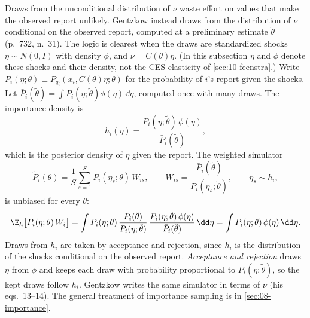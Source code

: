  Draws from the unconditional distribution of $\nu$ waste effort on values that make the
observed report unlikely. Gentzkow instead draws from the distribution of $\nu$ conditional on the observed report,
computed at a preliminary estimate $\tilde\theta$ (p.~732, n.~31). The logic is clearest when the draws are standardized
shocks $\eta \sim N(0, I)$ with density $\phi$, and $\nu = C(\theta)\eta$. (In this subsection $\eta$ and $\phi$
denote these shocks and their density, not the CES elasticity of \cref{sec:10-feenstra}.) Write $P_i(\eta; \theta) \equiv
P_{q_i}(x_i, C(\theta)\eta; \theta)$ for the probability of $i$'s report given the shocks. Let $\bar P_i(\tilde\theta) = \int
P_i(\eta; \tilde\theta)\phi(\eta)\,\dd\eta$, computed once with many draws. The importance density is
\begin{equation*}
  h_i(\eta) = \frac{P_i(\eta; \tilde\theta)\,\phi(\eta)}{\bar P_i(\tilde\theta)} ,
\end{equation*}
which is the posterior density of $\eta$ given the report. The weighted simulator
\begin{equation*}
  \tilde P_i(\theta) = \frac{1}{S}\sum_{s=1}^{S}P_i(\eta_s; \theta)\,W_{is}, \qquad
  W_{is} = \frac{\bar P_i(\tilde\theta)}{P_i(\eta_s; \tilde\theta)}, \qquad \eta_s \sim h_i,
\end{equation*}
is unbiased for every $\theta$:
\begin{equation*}
  \E_h\bigl[P_i(\eta; \theta)\,W_i\bigr]
  = \int P_i(\eta; \theta)\,\frac{\bar P_i(\tilde\theta)}{P_i(\eta; \tilde\theta)}\,
    \frac{P_i(\eta; \tilde\theta)\,\phi(\eta)}{\bar P_i(\tilde\theta)}\,\dd\eta
  = \int P_i(\eta; \theta)\,\phi(\eta)\,\dd\eta .
\end{equation*}
Draws from $h_i$ are taken by acceptance and rejection, since $h_i$ is the distribution of the shocks conditional on the
observed report. \emph{Acceptance and rejection} draws $\eta$ from $\phi$ and keeps each draw with probability
proportional to $P_i(\eta;\tilde\theta)$, so the kept draws follow $h_i$. Gentzkow writes the same simulator in terms of $\nu$ (his eqs.~13--14). The general treatment of
importance sampling is in \cref{sec:08-importance}.

